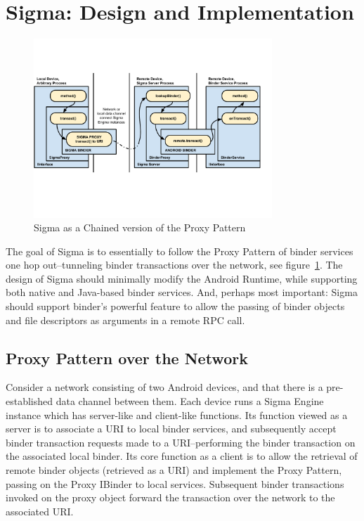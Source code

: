 \documentclass[prodmode]{acmlarge}
\begin{document}
\section{Sigma: Design and Implementation}
\label{sec:Sigma}
\begin{figure}[h]
\centering
\includegraphics[width=0.8\textwidth]{drawings/sigma_proxy_pattern.pdf}
\caption{Sigma as a Chained version of the Proxy Pattern}
\label{fig:SigmaChainProxy}
\end{figure}
The goal of Sigma is to essentially to follow the Proxy Pattern of binder services one hop out--tunneling binder transactions over the network, see figure~\ref{fig:SigmaChainProxy}. The design of Sigma should minimally modify the Android Runtime, while supporting both native and Java-based binder services. And, perhaps most important: Sigma should support binder's powerful feature to allow the passing of binder objects and file descriptors as arguments in a remote RPC call.

\subsection{Proxy Pattern over the Network}

Consider a network consisting of two Android devices, and that there is a pre-established data channel between them. Each device runs a Sigma Engine instance which has server-like and client-like functions. Its function viewed as a server is to associate a URI to local binder services, and subsequently accept binder transaction requests made to a URI--performing the binder transaction on the associated local binder. Its core function as a client is to allow the retrieval of remote binder objects (retrieved as a URI) and implement the Proxy Pattern, passing on the Proxy IBinder to local services. Subsequent binder transactions invoked on the proxy object forward the transaction over the network to the associated URI.
\end{document}
